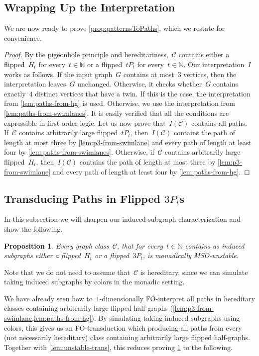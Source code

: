 \documentclass[11pt]{article}      \usepackage[margin=1in]{geometry}  \usepackage{microtype}
\newtheorem{proposition}[theorem]{Proposition}
\theoremstyle{definition}
\newcommand{\N}[0]{\mathrm{\mathbb{N}}}
\newcommand{\CC}{\mathcal{C}}
\begin{document}
\subsection{Wrapping Up the Interpretation}

We are now ready to prove \cref{prop:patternsToPaths}, which we restate for convenience.

\propPatternsToPaths*

\begin{proof}
    By the pigeonhole principle and hereditariness,~$\CC$ contains either a flipped~$H_t$ for every~$t\in \N$ or a flipped~$tP_t$ for every~$t\in\N$.
    Our interpretation~$I$ works as follows.
    If the input graph~$G$ contains at most~$3$ vertices, then the interpretation leaves~$G$ unchanged.
    Otherwise, it checks whether~$G$ contains exactly~$4$ distinct vertices that have a twin. If this is the case, the interpretation from \cref{lem:paths-from-hg} is used.
    Otherwise, we use the interpretation from \cref{lem:paths-from-swimlanes}.
    It is easily verified that all the conditions are expressible in first-order logic.
    Let us now prove that~$I(\CC)$ contains all paths.
    If~$\CC$ contains arbitrarily large flipped~$tP_t$, then~$I(\CC)$ contains the path of length at most three by \cref{lem:p3-from-swimlane} and every path of length at least four by \cref{lem:paths-from-swimlanes}.
    Otherwise, if~$\CC$ contains arbitrarily large flipped~$H_t$, then~$I(\CC)$ contains the path of length at most three by \cref{lem:p3-from-swimlane} and every path of length at least four by \cref{lem:paths-from-hg}.
\end{proof}


\subsection{Transducing Paths in Flipped \texorpdfstring{$3P_t$s}{3Pts}}

In this subsection we will sharpen our induced subgraph characterization and show the following.
\begin{proposition}
    \label{prop:3ptUnstable}
        Every graph class~$\CC$, that for every~$t\in\N$ contains as induced subgraphs either a flipped~$H_t$ or a flipped~$3P_t$, is monadically MSO-unstable.
\end{proposition}
Note that we do not need to assume that~$\CC$ is hereditary, since we can simulate taking induced subgraphs by colors in the monadic setting.

We have already seen how to~$1$-dimensionally FO-interpret all paths in hereditary classes containing arbitrarily large flipped half-graphs (\cref{lem:p3-from-swimlane,lem:paths-from-hg}). By simulating taking induced subgraphs using colors, this gives us an FO-transduction which producing all paths from every (not necessarily hereditary) class containing arbitrarily large flipped half-graphs. 
Together with \cref{lem:unstable-trans}, this reduces proving \cref{prop:3ptUnstable} to the following.
\end{document}
